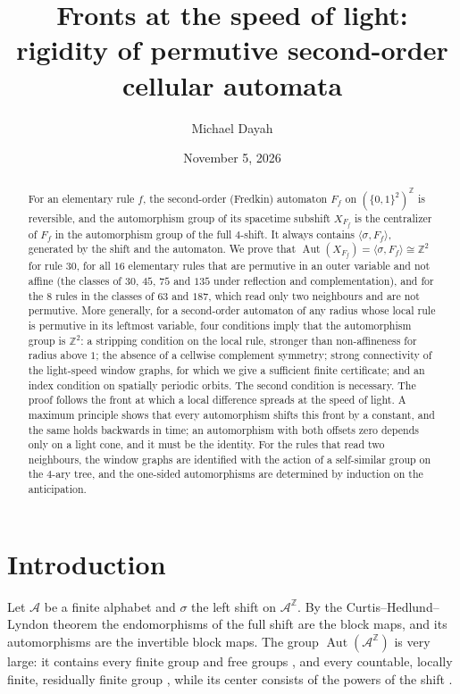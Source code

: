\documentclass[11pt]{amsart}
\title[Fronts at the speed of light]{Fronts at the speed of light: rigidity of permutive second-order cellular automata}
\author{Michael Dayah}
\date{November 5, 2026}
\theoremstyle{definition}
\theoremstyle{remark}
\newcommand{\Z}{\mathbb{Z}}
\newcommand{\A}{\mathcal{A}}
\newcommand{\Aut}{\operatorname{Aut}}
\newcommand{\sh}{\sigma}
\begin{document}
\begin{abstract}
For an elementary rule $f$, the second-order (Fredkin) automaton $F_f$ on $(\{0,1\}^2)^{\Z}$ is reversible, and the automorphism group of its spacetime subshift $X_{F_f}$ is the centralizer of $F_f$ in the automorphism group of the full $4$-shift. It always contains $\langle\sh,F_f\rangle$, generated by the shift and the automaton. We prove that $\Aut(X_{F_f})=\langle\sh,F_f\rangle\cong\Z^2$ for rule $30$, for all $16$ elementary rules that are permutive in an outer variable and not affine (the classes of $30$, $45$, $75$ and $135$ under reflection and complementation), and for the $8$ rules in the classes of $63$ and $187$, which read only two neighbours and are not permutive. More generally, for a second-order automaton of any radius whose local rule is permutive in its leftmost variable, four conditions imply that the automorphism group is $\Z^2$: a stripping condition on the local rule, stronger than non-affineness for radius above $1$; the absence of a cellwise complement symmetry; strong connectivity of the light-speed window graphs, for which we give a sufficient finite certificate; and an index condition on spatially periodic orbits. The second condition is necessary. The proof follows the front at which a local difference spreads at the speed of light. A maximum principle shows that every automorphism shifts this front by a constant, and the same holds backwards in time; an automorphism with both offsets zero depends only on a light cone, and it must be the identity. For the rules that read two neighbours, the window graphs are identified with the action of a self-similar group on the $4$-ary tree, and the one-sided automorphisms are determined by induction on the anticipation.
\end{abstract}

\maketitle

\section{Introduction}\label{sec:intro}

Let $\A$ be a finite alphabet and $\sh$ the left shift on $\A^{\Z}$. By the Curtis--Hedlund--Lyndon theorem \cite{Hedlund1969} the endomorphisms of the full shift are the block maps, and its automorphisms are the invertible block maps. The group $\Aut(\A^{\Z})$ is very large: it contains every finite group and free groups \cite{BLR1988}, and every countable, locally finite, residually finite group \cite[Theorem~3.1]{KimRoush1990}, while its center consists of the powers of the shift \cite{Ryan1972}.
\end{document}
